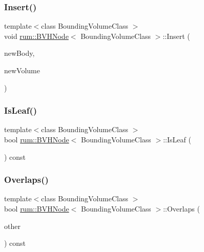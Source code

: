 \mbox{\label{classrum_1_1_b_v_h_node_ab74f21c80eb2ad8087b9b897fd3dccd4}} 
\subsubsection{\texorpdfstring{Insert()}{Insert()}}
{\footnotesize\ttfamily template$<$class Bounding\+Volume\+Class $>$ \\
void \hyperlink{classrum_1_1_b_v_h_node}{rum\+::\+B\+V\+H\+Node}$<$ Bounding\+Volume\+Class $>$\+::Insert (\begin{DoxyParamCaption}\item[{\hyperlink{classrum_1_1_rigid_body}{Rigid\+Body} $\ast$}]{new\+Body,  }\item[{const Bounding\+Volume\+Class \&}]{new\+Volume }\end{DoxyParamCaption})\hspace{0.3cm}{\ttfamily [protected]}}

\mbox{\label{classrum_1_1_b_v_h_node_ad916d1d80373a61b95d99d6ae7472007}} 
\subsubsection{\texorpdfstring{Is\+Leaf()}{IsLeaf()}}
{\footnotesize\ttfamily template$<$class Bounding\+Volume\+Class $>$ \\
bool \hyperlink{classrum_1_1_b_v_h_node}{rum\+::\+B\+V\+H\+Node}$<$ Bounding\+Volume\+Class $>$\+::Is\+Leaf (\begin{DoxyParamCaption}{ }\end{DoxyParamCaption}) const}

\mbox{\label{classrum_1_1_b_v_h_node_a4d60cfdfc53028f0a567fe5f5c316848}} 
\subsubsection{\texorpdfstring{Overlaps()}{Overlaps()}}
{\footnotesize\ttfamily template$<$class Bounding\+Volume\+Class $>$ \\
bool \hyperlink{classrum_1_1_b_v_h_node}{rum\+::\+B\+V\+H\+Node}$<$ Bounding\+Volume\+Class $>$\+::Overlaps (\begin{DoxyParamCaption}\item[{\hyperlink{classrum_1_1_b_v_h_node}{B\+V\+H\+Node}$<$ Bounding\+Volume\+Class $>$ $\ast$}]{other }\end{DoxyParamCaption}) const\hspace{0.3cm}{\ttfamily [protected]}}

